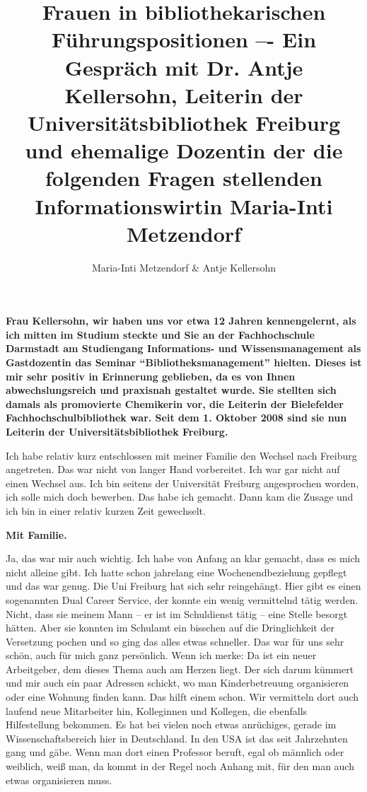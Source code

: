 \documentclass[a4paper,
fontsize=11pt,
oneside,
numbers=noperiodatend,
parskip=half-,
bibliography=totoc,
final
]{scrartcl}
\title{\LARGE{Frauen in bibliothekarischen Füh\-rungs\-po\-si\-tionen –- Ein Gespräch mit Dr. Antje Kellersohn, Leiterin der Universitätsbibliothek Freiburg und ehemalige Dozentin der die folgenden Fragen stellenden Informationswirtin Maria-Inti Metzendorf}} %
\author{Maria-Inti Metzendorf \& Antje Kellersohn} %
\date{}
\begin{document}
\maketitle
\thispagestyle{fancyplain} 


\textbf{Frau Kellersohn, wir haben uns vor etwa 12 Jahren kennengelernt,
als ich mitten im Studium steckte und Sie an der Fachhochschule
Darmstadt am Studiengang Informations- und Wissensmanagement als
Gastdozentin das Seminar \enquote{Bibliotheksmanagement} hielten. Dieses
ist mir sehr positiv in Erinnerung geblieben, da es von Ihnen
abwechslungsreich und praxisnah gestaltet wurde. Sie stellten sich
damals als promovierte Chemikerin vor, die Leiterin der Bielefelder
Fachhochschulbibliothek war. Seit dem 1. Oktober 2008 sind sie nun
Leiterin der Universitätsbibliothek Freiburg.}

Ich habe relativ kurz entschlossen mit meiner Familie den Wechsel nach
Freiburg angetreten. Das war nicht von langer Hand vorbereitet. Ich war
gar nicht auf einen Wechsel aus. Ich bin seitens der Universität
Freiburg angesprochen worden, ich solle mich doch bewerben. Das habe ich
gemacht. Dann kam die Zusage und ich bin in einer relativ kurzen Zeit
gewechselt.

\textbf{Mit Familie.}

Ja, das war mir auch wichtig. Ich habe von Anfang an klar gemacht, dass
es mich nicht alleine gibt. Ich hatte schon jahrelang eine
Wochenendbeziehung gepflegt und das war genug. Die Uni Freiburg hat sich
sehr reingehängt. Hier gibt es einen sogenannten Dual Career Service,
der konnte ein wenig vermittelnd tätig werden. Nicht, dass sie meinem
Mann -- er ist im Schuldienst tätig -- eine Stelle besorgt hätten. Aber
sie konnten im Schulamt ein bisschen auf die Dringlichkeit der
Versetzung pochen und so ging das alles etwas schneller. Das war für uns
sehr schön, auch für mich ganz persönlich. Wenn ich merke: Da ist ein
neuer Arbeitgeber, dem dieses Thema auch am Herzen liegt. Der sich darum
kümmert und mir auch ein paar Adressen schickt, wo man Kinderbetreuung
organisieren oder eine Wohnung finden kann. Das hilft einem schon. Wir
vermitteln dort auch laufend neue Mitarbeiter hin, Kolleginnen und
Kollegen, die ebenfalls Hilfestellung bekommen. Es hat bei vielen noch
etwas anrüchiges, gerade im Wissenschaftsbereich hier in Deutschland. In
den USA ist das seit Jahrzehnten gang und gäbe. Wenn man dort einen
Professor beruft, egal ob männlich oder weiblich, weiß man, da kommt in
der Regel noch Anhang mit, für den man auch etwas organisieren muss.
\end{document}
